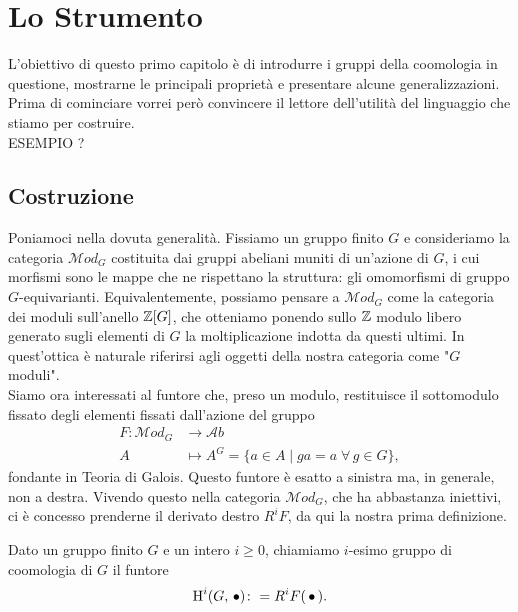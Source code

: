 \chapter{Lo Strumento}

L'obiettivo di questo primo capitolo è di introdurre i gruppi della coomologia in questione, mostrarne le principali proprietà e presentare alcune generalizzazioni. Prima di cominciare vorrei però convincere il lettore dell'utilità del linguaggio che stiamo per costruire.\\

ESEMPIO ? \\

\section{Costruzione}

Poniamoci nella dovuta generalità. Fissiamo un gruppo finito $ G $ e consideriamo la categoria $ \mathcal{M}od_G $ costituita dai gruppi abeliani muniti di un'azione di $ G $, i cui morfismi sono le mappe che ne rispettano la struttura: gli omomorfismi di gruppo $ G $-equivarianti. Equivalentemente, possiamo pensare a $ \mathcal{M}od_G $ come la categoria dei moduli sull'anello $ \mathbb{Z}[G] $, che otteniamo ponendo sullo $ \mathbb{Z} $ modulo libero generato sugli elementi di $ G $ la moltiplicazione indotta da questi ultimi. In quest'ottica è naturale riferirsi agli oggetti della nostra categoria come "$ G $ moduli". \\

Siamo ora interessati al funtore che, preso un modulo, restituisce il sottomodulo fissato degli elementi fissati dall'azione del gruppo
\begin{align*}
	F \colon \mathcal{M}od_G &\to \mathcal{A}b \\
	 A &\mapsto A^G = \{ a \in A \mid ga = a \; \forall \, g \in G \},
\end{align*}
fondante in Teoria di Galois. Questo funtore è esatto a sinistra ma, in generale, non a destra. Vivendo questo nella categoria $ \mathcal{M}od_G $, che ha abbastanza iniettivi, ci è concesso prenderne il derivato destro $ R^iF $, da qui la nostra prima definizione.

\begin{definition}
	Dato un gruppo finito $ G $ e un intero $ i \geq 0 $, chiamiamo $ i $-esimo gruppo di coomologia di $ G $ il funtore
	\[ \operatorname{H}^i(G, \, \bullet) \colon = R^iF(\,\bullet\,). \]
\end{definition}

